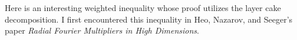 \begin{comment}
\begin{theorem}
    If $p > 1$,
    \[ \vvvert f \vvvert_{p,q} \leq \frac{p}{p-1} \| f \|_{p,q}. \]
\end{theorem}
\begin{proof}
    We utilize a \emph{Hardy's inequality} technique, which shows that the $L^p$ norm of the averages of a function are comparable to the $L^p$ norm of the function. Applying Minkowski's integral inequality, we conclude that
    \begin{align*}
        \left( \frac{q}{p} \int_0^\infty [t^{1/p} m(t)]^q \frac{dt}{t} \right)^{1/q} &= \left( \frac{q}{p} \int_0^\infty \left( \int_0^1 t^{1/p} f^*(ts)\; ds \right)^q\; \frac{dt}{t} \right)^{1/q}\\
        &\leq \int_0^1 \left( \int_0^\infty \frac{q}{p} (t^{1/p} f^*(ts))^q\; \frac{dt}{t} \right)^{1/q}\; ds\\
        &\leq \left( \int_0^1 s^{- 1/p}\; ds \right) \left( \frac{q}{p} \int_0^\infty (t^{1/p} f^*(t))^q\; \frac{dt}{t} \right)^{1/q}\\
        &\leq \frac{1}{1 - 1/p} \| f \|_{p,q} = \frac{p}{p - 1} \| f \|_{p,q}.
    \end{align*}
    For $q = \infty$, and $t > 0$, we have
    \begin{align*}
        t^{1/p} m(t) &= t^{1/p - 1} \int_0^t f^*(t)\\
        &\leq (\sup_{s > 0} s^{1/p} f^*(s)) t^{1/p - 1} \int_0^t t^{-1/p}\\
        &= \frac{1}{1 - 1/p} \| f \|_{p,\infty} = \frac{p}{p-1} \| f \|_{p,\infty}.
    \end{align*}
    since $t$ was arbitrary, this gives the required bound.
\end{proof}

\end{comment}

Here is an interesting weighted inequality whose proof utilizes the layer cake decomposition. I first encountered this inequality in Heo, Nazarov, and Seeger's paper \emph{Radial Fourier Multipliers in High Dimensions}.

